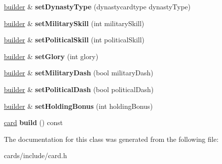 \begin{DoxyCompactItemize}
\hyperlink{classl5r_1_1card_1_1builder}{builder} \& {\bfseries set\+Dynasty\+Type} (dynastycardtype dynasty\+Type)
\item 
\mbox{\label{classl5r_1_1card_1_1builder_af0126c57be6302b7ec8f092e9d3bd8df}} 
\hyperlink{classl5r_1_1card_1_1builder}{builder} \& {\bfseries set\+Military\+Skill} (int military\+Skill)
\item 
\mbox{\label{classl5r_1_1card_1_1builder_a27a60f46dba73949fb6ef22cd2e438b4}} 
\hyperlink{classl5r_1_1card_1_1builder}{builder} \& {\bfseries set\+Political\+Skill} (int political\+Skill)
\item 
\mbox{\label{classl5r_1_1card_1_1builder_ac15db08076383012b0e260f1716893f9}} 
\hyperlink{classl5r_1_1card_1_1builder}{builder} \& {\bfseries set\+Glory} (int glory)
\item 
\mbox{\label{classl5r_1_1card_1_1builder_a3fe79905c6198ed130b5a5f7fea61c4c}} 
\hyperlink{classl5r_1_1card_1_1builder}{builder} \& {\bfseries set\+Military\+Dash} (bool military\+Dash)
\item 
\mbox{\label{classl5r_1_1card_1_1builder_ae59947425ee5663249cece55a23f5900}} 
\hyperlink{classl5r_1_1card_1_1builder}{builder} \& {\bfseries set\+Political\+Dash} (bool political\+Dash)
\item 
\mbox{\label{classl5r_1_1card_1_1builder_ad8efcef72ef3024e62ea971f5538dddc}} 
\hyperlink{classl5r_1_1card_1_1builder}{builder} \& {\bfseries set\+Holding\+Bonus} (int holding\+Bonus)
\item 
\mbox{\label{classl5r_1_1card_1_1builder_a343e9d9d1f7b55caacab2d3122e29b48}} 
\hyperlink{classl5r_1_1card}{card} {\bfseries build} () const
\end{DoxyCompactItemize}


The documentation for this class was generated from the following file\+:\begin{DoxyCompactItemize}
\item 
cards/include/card.\+h\end{DoxyCompactItemize}
